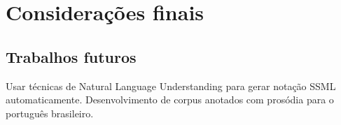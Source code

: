 
\chapter{Considerações finais}

\section{Trabalhos futuros}
Usar técnicas de Natural Language Understanding para gerar notação SSML
automaticamente. Desenvolvimento de corpus anotados com prosódia para o
português brasileiro.
